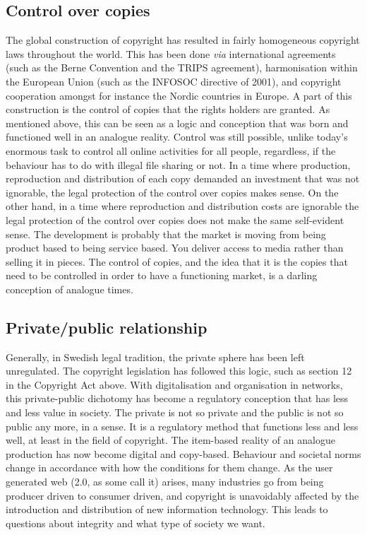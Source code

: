 \subsection{Control over copies}
\label{ss:darling_conceptions:darling_conceptions:control}

The global construction of copyright has resulted in fairly homogeneous
copyright laws throughout the world. This has been done \textit{via} international
agreements (such as the Berne Convention and the TRIPS agreement), harmonisation
within the European Union (such as the INFOSOC directive of 2001), and copyright
cooperation amongst for instance the Nordic countries in Europe. A part of this
construction is the control of copies that the rights holders are granted. As
mentioned above, this can be seen as a logic and conception that was born and
functioned well in an analogue reality. Control was still possible, unlike
today's enormous task to control all online activities for all people,
regardless, if the behaviour has to do with illegal f\hbox{}ile sharing or not. In a
time where production, reproduction and distribution of each copy demanded an
investment that was not ignorable, the legal protection of the control over
copies makes sense. On the other hand, in a time where reproduction and
distribution costs are ignorable the legal protection of the control over copies
does not make the same self-evident sense. The development is probably that the
market is moving from being product based to being service based. You deliver
access to media rather than selling it in pieces. The control of copies, and the
idea that it is the copies that need to be controlled in order to have a
functioning market, is a darling conception of analogue times.


\subsection{Private/public relationship}
\label{ss:darling_conceptions:darling_conceptions:priv_pub_rels}

Generally, in Swedish legal tradition, the private sphere has been left
unregulated. The copyright legislation has followed this logic, such as section
12 in the Copyright Act above. With digitalisation and organisation in networks,
this private-public dichotomy has become a regulatory conception that has less
and less value in society. The private is not so private and the public is not
so public any more, in a sense. It is a regulatory method that functions less
and less well, at least in the f\hbox{}ield of copyright. The item-based reality of an
analogue production has now become digital and copy-based. Behaviour and
societal norms change in accordance with how the conditions for them change. As
the user generated web (2.0, as some call it) arises, many industries go from
being producer driven to consumer driven, and copyright is unavoidably af\hbox{}fected
by the introduction and distribution of new information technology. This leads
to questions about integrity and what type of society we want.



